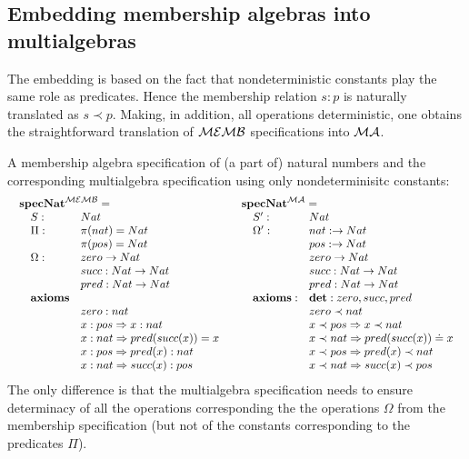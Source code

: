 \documentclass[10pt]{article}
\begin{document}
\subsection{Embedding membership algebras into multialgebras}\label{sub:mamb}
%
The embedding is based on the fact that nondeterministic constants play the
same role as predicates. Hence the membership relation $s:p$ is naturally
translated as $s\prec p$. Making, in addition, all operations deterministic,
one obtains the straightforward translation of ${\mathcal{MEMB}}$ specifications
into ${\mathcal{MA}}$.

\begin{example}
A membership algebra specification of (a part of) natural numbers and the
corresponding multialgebra specification using only nondeterminisitc constants:
{\small{\[ \begin{array}{ll}
\begin{array}[t]{lll}
	\multicolumn{3}{l}{{\bf spec Nat}^{\inst{MEMB}}= }\\
		&S:
			 & Nat\\
		&\Pi:
			 & \pi(nat) = Nat\\
			&& \pi(pos) = Nat\\
		&\Omega:
			 & zero \to Nat\\
			&& succ:Nat \to Nat\\
			&& pred:Nat \to Nat\\
		&{\bf axioms} \\
			&& zero:nat\\
			&& x:pos \To x:nat\\
			&& x:nat \To pred(succ(x))=x\\
			&& x:pos \To pred(x):nat\\	
			&& x:nat \To succ(x):pos\\
\end{array}
&
\begin{array}[t]{lll}
		\multicolumn{3}{l}{ {\bf spec Nat}^{\inst{MA}}= }\\
		&S':
			 & Nat\\
		&\Omega':
			& nat: \to Nat\\
			&& pos: \to Nat\\
			&& zero \to Nat\\
			&& succ:Nat \to Nat\\
			&& pred:Nat \to Nat\\
		&{\bf axioms:}
			 & {\bf det}: zero, succ, pred \\
			&& zero \prec nat\\	
			&& x \prec pos \To x \prec nat\\
			&& x\prec nat \To pred(succ(x))\eleq x\\
			&& x \prec pos \To pred(x) \prec nat\\
			&& x \prec nat \To succ(x) \prec pos\\
\end{array}
\end{array}
\] }}
The only difference is that the multialgebra specification needs to ensure
determinacy of all the operations corresponding the the operations $\Omega$ from
the membership specification (but not of the constants corresponding to the
predicates $\Pi$).


\end{example}
\end{document}
